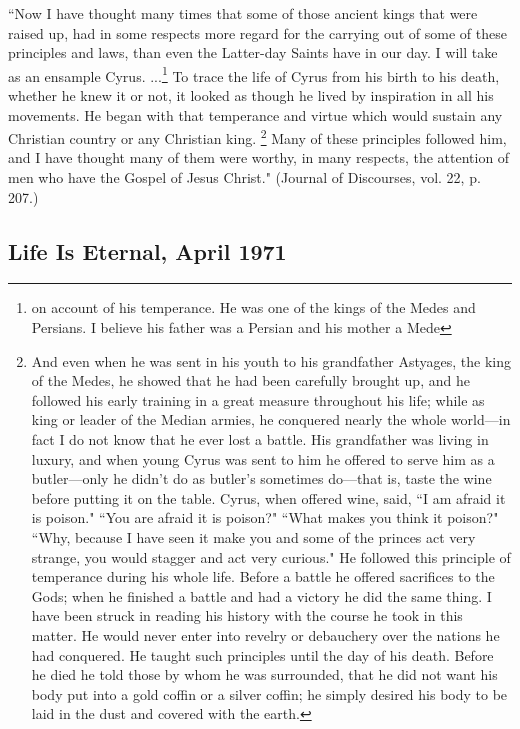 ``Now I have thought many times that some of those ancient kings that were raised up, had in some respects more regard for the carrying out of some of these principles and laws, than even the Latter-day Saints have in our day. I will take as an ensample Cyrus. ...\footnote{on account of his temperance. He was one of the kings of the Medes and Persians. I believe his father was a Persian and his mother a Mede} To trace the life of Cyrus from his birth to his death, whether he knew it or not, it looked as though he lived by inspiration in all his movements. He began with that temperance and virtue which would sustain any Christian country or any Christian king. \footnote{And even when he was sent in his youth to his grandfather Astyages, the king of the Medes, he showed that he had been carefully brought up, and he followed his early training in a great measure throughout his life; while as king or leader of the Median armies, he conquered nearly the whole world—in fact I do not know that he ever lost a battle. His grandfather was living in luxury, and when young Cyrus was sent to him he offered to serve him as a butler—only he didn't do as butler's sometimes do—that is, taste the wine before putting it on the table. Cyrus, when offered wine, said, ``I am afraid it is poison." ``You are afraid it is poison?" ``What makes you think it poison?" ``Why, because I have seen it make you and some of the princes act very strange, you would stagger and act very curious." He followed this principle of temperance during his whole life. Before a battle he offered sacrifices to the Gods; when he finished a battle and had a victory he did the same thing. I have been struck in reading his history with the course he took in this matter. He would never enter into revelry or debauchery over the nations he had conquered. He taught such principles until the day of his death. Before he died he told those by whom he was surrounded, that he did not want his body put into a gold coffin or a silver coffin; he simply desired his body to be laid in the dust and covered with the earth.} Many of these principles followed him, and I have thought many of them were worthy, in many respects, the attention of men who have the Gospel of Jesus Christ." (Journal of Discourses, vol. 22, p. 207.)

\subsection{Life Is Eternal, April 1971}

